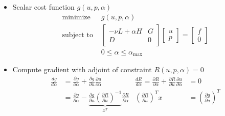 \documentclass[12pt,t]{beamer}
\begin{document}
\begin{frame}
  \begin{itemize}
  \item Scalar cost function $g(u,p,\alpha)$
    \begin{align*}
      \text{minimize } & g(u,p,\alpha) \\
      \text{subject to } & \begin{bmatrix} -\nu L + \alpha H & G \\
        D & 0 \end{bmatrix} \begin{bmatrix} u \\ p \end{bmatrix}
      = \begin{bmatrix} f \\ 0 \end{bmatrix} \\
      & 0 \le \alpha \le \alpha_{\text{max}}
    \end{align*}
  \item Compute gradient with adjoint of constraint $R(u,p,\alpha) = 0$
    \begin{align*}
      \frac{d g}{d \alpha} &= \frac{\partial g}{\partial \alpha}
      + \frac{\partial g}{\partial u} \frac{\partial u}{\partial \alpha}
      &
      \frac{d R}{d \alpha} = \frac{\partial R}{\partial \alpha}
      + \frac{\partial R}{\partial u} \frac{\partial u}{\partial \alpha}
      &= 0 \\
      &= \frac{\partial g}{\partial \alpha}
      - \underbrace{\frac{\partial g}{\partial u}
      \left(\frac{\partial R}{\partial u}\right)^{-1}}_{x^T}
      \frac{\partial R}{\partial \alpha}
      &
      \left( \frac{\partial R}{\partial u} \right)^T x
      &= \left(\frac{\partial g}{\partial u} \right)^T
    \end{align*}
  \end{itemize}
\end{frame}
\end{document}

